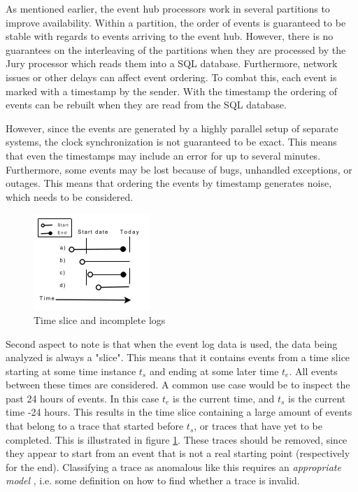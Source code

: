As mentioned earlier, the event hub processors work in several partitions to improve availability.
Within a partition, the order of events is guaranteed to be stable with regards to events arriving to the event hub. However, there is no guarantees on the interleaving of the partitions when they are processed by the Jury processor which reads them into a SQL database. 
Furthermore, network issues or other delays can affect event ordering. To combat this, each event is marked with a timestamp by the sender. With the timestamp the ordering of events can be rebuilt when they are read from the SQL database.

However, since the events are generated by a highly parallel setup of separate systems, the clock synchronization is not guaranteed to be exact. This means that even the timestamps may include an error for up to several minutes.
Furthermore, some events may be lost because of bugs, unhandled exceptions, or outages.
This means that ordering the events by timestamp generates noise, which needs to be considered.

\begin{figure}[htb]
\centering \includegraphics[width=0.5\linewidth]{gfx/slice.png}
\caption{Time slice and incomplete logs }
\label{fig:timeslice}
\end{figure}

Second aspect to note is that when the event log data is used, the data being analyzed is always a "slice".
This means that it contains events from a time slice starting at some time instance $t_s$ and ending at some later time $t_e$. All events between these times are considered. A common use case would be to inspect the past 24 hours of events. In this case $t_e$ is the current time, and $t_s$ is the current time -24 hours. 
This results in the time slice containing a large amount of events that belong to a trace that started before $t_s$, or traces that have yet to be completed. This is illustrated in figure \ref{fig:timeslice}. These traces should be removed, since they appear to start from an event that is not a real starting point (respectively for the end). Classifying a trace as anomalous like this requires an \emph{appropriate model} \cite{bezerra2009anomaly}, 
i.e. some definition on how to find whether a trace is invalid.

